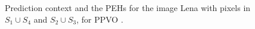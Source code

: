 \documentclass[review,3p,10pt,sort&compress]{elsarticle}
\begin{document}
\begin{figure}
{\begin{minipage}[t]{0.31\linewidth}
    \end{minipage}
}
\centering
\caption{Prediction context and the PEHs for the image Lena with pixels in $S_1 \cup S_4$ and $S_2 \cup S_3$, for PPVO \cite{Qu2015PPVO}.}
\label{Fig.PPVOCNandHist}
\end{figure}
\end{document}
